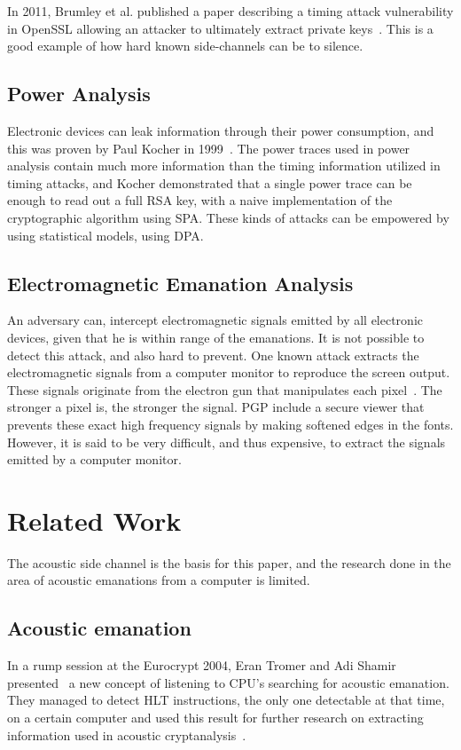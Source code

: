 In 2011, Brumley et al. published a paper describing a timing attack vulnerability in OpenSSL allowing an attacker to ultimately extract private keys~\cite{DBLP:conf/esorics/BrumleyT11}.
This is a good example of how hard known side-channels can be to silence.


\subsection{Power Analysis}\label{chp2:subsec:power_analysis}
Electronic devices can leak information through their power consumption, and this was proven by Paul Kocher in 1999~\cite{DBLP:conf/crypto/KocherJJ99}.
The power traces used in power analysis contain much more information than the timing information utilized in timing attacks, and Kocher demonstrated that a single power trace can be enough to read out a full RSA key, with a naive implementation of the cryptographic algorithm using \gls{SPA}.
These kinds of attacks can be empowered by using statistical models, using \gls{DPA}.


\subsection{Electromagnetic Emanation Analysis}\label{chp2:subsec:electromagnetic_attacks}
An adversary can, intercept electromagnetic signals emitted by all electronic devices, given that he is within range of the emanations. 
It is not possible to detect this attack, and also hard to prevent.
One known attack extracts the electromagnetic signals from a computer monitor to reproduce the screen output.
These signals originate from the electron gun that manipulates each pixel~\cite{url:tempest_sans}. 
The stronger a pixel is, the stronger the signal.
PGP include a secure viewer that prevents these exact high frequency signals by making softened edges in the fonts.
However, it is said to be very difficult, and thus expensive, to extract the signals emitted by a computer monitor.


\section{Related Work}\label{chp2:sec:related_work}
The acoustic side channel is the basis for this paper, and the research done in the area of acoustic emanations from a computer is limited.

\subsection{Acoustic emanation}
In a rump session at the Eurocrypt 2004, Eran Tromer and Adi Shamir presented~\cite{tromer2004acoustic} a new concept of listening to CPU's searching for acoustic emanation. 
They managed to detect HLT instructions, the only one detectable at that time, on a certain computer and used this result for further research on extracting information used in acoustic cryptanalysis~\cite{tromer2007hardware}.


